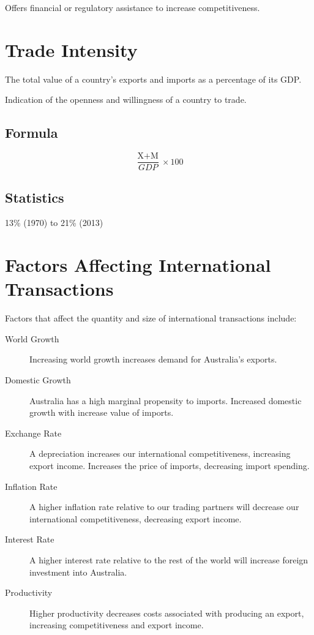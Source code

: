 \documentclass[a4paper,11pt]{article}
\begin{document}
Offers financial or regulatory assistance to increase competitiveness.




\section{Trade Intensity}

The total value of a country's exports and imports as a percentage of its GDP.

Indication of the openness and willingness of a country to trade.


\subsection{Formula}

$$
\frac{\text{X} + \text{M}}{GDP} \times 100
$$


\subsection{Statistics}

13\% (1970) to 21\% (2013)




\section{Factors Affecting International Transactions}

Factors that affect the quantity and size of international transactions
include:

\begin{description}
\item [World Growth] Increasing world growth increases demand for Australia's
	exports.
\item [Domestic Growth] Australia has a high marginal propensity to imports.
	Increased domestic growth with increase value of imports.
\item [Exchange Rate] A depreciation increases our international
	competitiveness, increasing export income. Increases the price of imports,
	decreasing import spending.
\item [Inflation Rate] A higher inflation rate relative to our trading partners
	will decrease our international competitiveness, decreasing export income.
\item [Interest Rate] A higher interest rate relative to the rest of the world
	will increase foreign investment into Australia.
\item [Productivity] Higher productivity decreases costs associated with
	producing an export, increasing competitiveness and export income.
\end{description}
\end{document}
